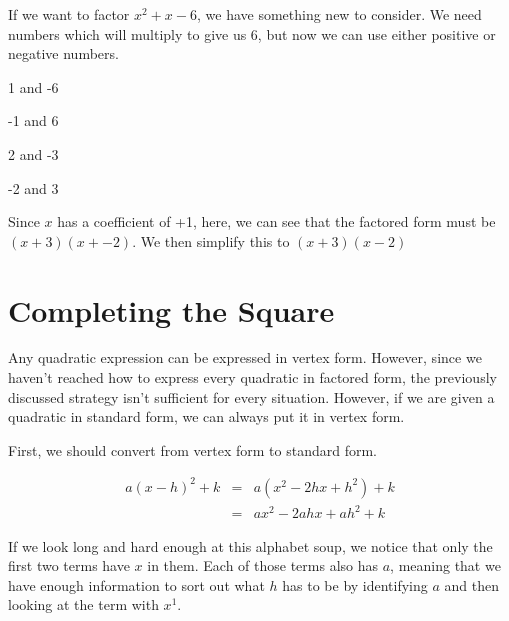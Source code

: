 \begin{example}

If we want to factor $x^2 +x - 6$, we have something new to consider.  We need numbers which will multiply to give us 6, but now we can use either positive or negative numbers.

1 and -6

-1 and 6

2 and -3

-2 and 3

Since $x$ has a coefficient of +1, here, we can see that the factored form must be $(x+3)(x + -2)$.  We then simplify this to $(x+3)(x - 2)$

\end{example}

\section*{Completing the Square}

Any quadratic expression can be expressed in vertex form.  However, since we haven't reached how to express every quadratic in factored form, the previously discussed strategy isn't sufficient for every situation.  However, if we are given a quadratic in standard form, we can always put it in vertex form.

First, we should convert from vertex form to standard form.

$$\begin{array}{rcl}
a(x-h)^2 + k & = & a(x^2 - 2hx + h^2) + k\\
& = & ax^2 - 2ahx + ah^2 + k\end{array}$$

If we look long and hard enough at this alphabet soup, we notice that only the first two terms have $x$ in them.  Each of those terms also has $a$, meaning that we have enough information to sort out what $h$ has to be by identifying $a$ and then looking at the term with $x^1$.

